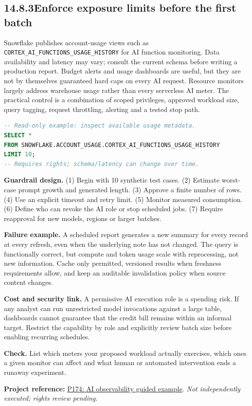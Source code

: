 \documentclass[11pt,twoside]{article}
\newcommand{\topic}[2]{\subsection*{#1\quad #2}}
\newcommand{\repo}[2]{\par\begingroup\fontsize{8.0}{9.6}\selectfont\sffamily\color{inkgray}\textbf{Project reference:} \href{#2}{#1}. \textit{Not independently executed; rights review pending.}\par\endgroup}
\begin{document}
\topic{14.8.3}{Enforce exposure limits before the first batch}
Snowflake publishes account-usage views such as \texttt{CORTEX\_AI\_}\allowbreak\texttt{FUNCTIONS\_USAGE\_}\allowbreak\texttt{HISTORY} for AI function monitoring. Data availability and latency may vary; consult the current schema before writing a production report. Budget alerts and usage dashboards are useful, but they are not by themselves guaranteed hard caps on every AI request. Resource monitors largely address warehouse usage rather than every serverless AI meter. The practical control is a combination of scoped privileges, approved workload size, query tagging, request throttling, alerting and a tested stop path.
\begin{lstlisting}[language=SQL]
-- Read-only example: inspect available usage metadata.
SELECT *
FROM SNOWFLAKE.ACCOUNT_USAGE.CORTEX_AI_FUNCTIONS_USAGE_HISTORY
LIMIT 10;
-- Requires rights; schema/latency can change over time.
\end{lstlisting}
\textbf{Guardrail design.} (1) Begin with 10 synthetic test cases. (2) Estimate worst-case prompt growth and generated length. (3) Approve a finite number of rows. (4) Use an explicit timeout and retry limit. (5) Monitor measured consumption. (6) Define who can revoke the AI role or stop scheduled jobs. (7) Require reapproval for new models, regions or larger batches.\par
\textbf{Failure example.} A scheduled report generates a new summary for every record at every refresh, even when the underlying note has not changed. The query is functionally correct, but compute and token usage scale with reprocessing, not new information. Cache only permitted, versioned results when freshness requirements allow, and keep an auditable invalidation policy when source content changes.
\begin{insight}\textbf{Cost and security link.} A permissive AI execution role is a spending risk. If any analyst can run unrestricted model invocations against a large table, dashboards cannot guarantee that the credit bill remains within an informal target. Restrict the capability by role and explicitly review batch size before enabling recurring schedules.\end{insight}
\textbf{Check.} List which meters your proposed workload actually exercises, which ones a given monitor can affect and what human or automated intervention ends a runaway experiment.
\repo{P174: AI observability guided example}{https://github.com/Snowflake-Labs/sfguide-getting-started-with-ai-observability}
\end{document}
